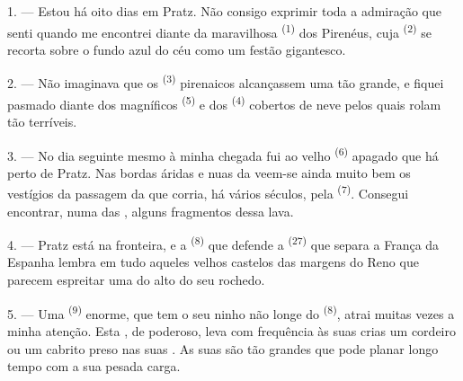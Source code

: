 %

\VUsaut{4.0mm}
\VUsaut{3.0mm}

\VUsaut{3.0mm}

\VUsaut{3.0mm}

1. --- Estou há oito dias em Pratz. Não consigo exprimir toda a admiração
que senti quando me encontrei diante da maravilhosa 
\textsuperscript{(1)} dos Pirenéus, cuja  \textsuperscript{(2)} se
recorta sobre o fundo azul do céu como um festão gigantesco.

2. --- Não imaginava que os  \textsuperscript{(3)} pirenaicos
alcançassem uma  tão grande, e fiquei pasmado diante dos
magníficos  \textsuperscript{(5)} e dos 
\textsuperscript{(4)} cobertos de neve pelos quais rolam  tão
terríveis.

\VUsaut{3.0mm}
\VUsaut{3.0mm}

3. --- No dia seguinte mesmo à minha chegada fui ao velho 
\textsuperscript{(6)} apagado que há perto de Pratz. Nas bordas áridas e nuas
da  veem-se ainda muito bem os vestígios da passagem da
 que corria, há vários séculos, pela  \textsuperscript{(7)}. Consegui encontrar, numa das ,
alguns fragmentos dessa lava.

4. --- Pratz está na fronteira, e a  \textsuperscript{(8)} que
defende a  \textsuperscript{(27)} que separa a França da Espanha
lembra em tudo aqueles velhos castelos das margens do Reno que parecem
espreitar uma  do alto do seu rochedo.

5. --- Uma  \textsuperscript{(9)} enorme, que tem o seu ninho não
longe do  \textsuperscript{(8)}, atrai muitas vezes a minha atenção.
Esta , de  poderoso, leva com frequência
às suas crias um cordeiro ou um cabrito preso nas suas . As
suas  são tão grandes que pode planar longo tempo com a sua
pesada carga.

